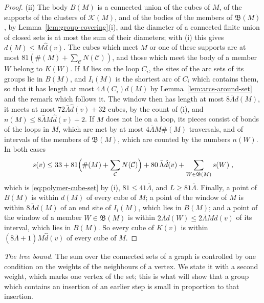 \documentclass[11pt]{preprint}
\numberwithin{equation}{section}
\theoremstyle{definition}
\theoremstyle{remark}
\theoremstyle{plain}
\begin{document}
\begin{proof}
(ii) The body $B(M)$ is a connected union of the cubes of $M$, of the supports of the clusters of $\mathcal K(M)$, and of the bodies of the members of $\mathfrak B(M)$, by Lemma~\ref{lem:group-covering}(i), and the diameter of a connected finite union of closed sets is at most the sum of their diameters; with (i) this gives $d(M) \leq M\hat d(v)$. The cubes which meet $M$ or one of these supports are at most $81(\#(M) + \sum_{\mathcal C}N(\mathcal C))$, and those which meet the body of a member $W$ belong to $K(W)$. If $M$ lies on the loop $C_i$, the sites of the arc sets of its groups lie in $B(M)$, and $I_i(M)$ is the shortest arc of $C_i$ which contains them, so that it has length at most $4\Lambda(C_i)d(M)$ by Lemma~\ref{lem:arcs-around-set} and the remark which follows it. The window then has length at most $8\bar\Lambda d(M)$, it meets at most $72\bar\Lambda\hat d(v) + 32$ cubes, by the count of (i), and $n(M) \leq 8\bar\Lambda M\hat d(v) + 2$. If $M$ does not lie on a loop, its pieces consist of bonds of the loops in $M$, which are met by at most $4\bar\Lambda M\#(M)$ traversals, and of intervals of the members of $\mathfrak B(M)$, which are counted by the numbers $n(W)$. In both cases
\[
    s(v) \leq 33 + 81\Bigl(\#(M) + \sum_{\mathcal C}N(\mathcal C)\Bigr) + 80\,\bar\Lambda\hat d(v) + \sum_{W \in \mathfrak B(M)}s(W)\;,
\]
which is \eqref{eq:polymer-cube-set} by (i), $81 \leq 41\bar\Lambda$, and $L \geq 81\bar\Lambda$. Finally, a point of $B(M)$ is within $d(M)$ of every cube of $M$; a point of the window of $M$ is within $8\bar\Lambda d(M)$ of an end site of $I_i(M)$, which lies in $B(M)$; and a point of the window of a member $W \in \mathfrak B(M)$ is within $2\bar\Lambda d(W) \leq 2\bar\Lambda M\hat d(v)$ of its interval, which lies in $B(M)$. So every cube of $K(v)$ is within $(8\bar\Lambda + 1)M\hat d(v)$ of every cube of $M$.
\end{proof}

\emph{The tree bound.} The sum over the connected sets of a graph is controlled by one condition on the weights of the neighbours of a vertex. We state it with a second weight, which marks one vertex of the set; this is what will show that a group which contains an insertion of an earlier step is small in proportion to that insertion.
\end{document}
